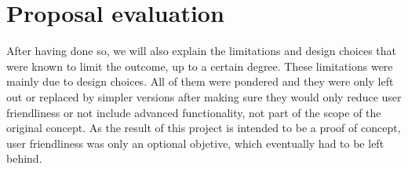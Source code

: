 \chapter{Proposal evaluation} \label{chap:eval}

After having done so, we will also explain the limitations and design choices that were known to limit the outcome, up to a certain degree.
These limitations were mainly due to design choices.
All of them were pondered and they were only left out or replaced by simpler versions after making sure they would only reduce user friendliness or not include advanced functionality, not part of the scope of the original concept.
As the result of this project is intended to be a proof of concept, user friendliness was only an optional objetive, which eventually had to be left behind.
